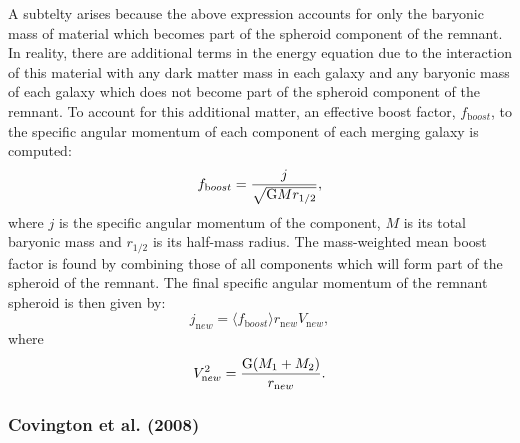 A subtelty arises because the above expression accounts for only the baryonic mass of material which becomes part of the spheroid \gls{component} of the remnant. In reality, there are additional terms in the energy equation due to the interaction of this material with any dark matter mass in each galaxy and any baryonic mass of each galaxy which does not become part of the spheroid \gls{component} of the remnant. To account for this additional matter, an effective boost factor, $f_{\mathrm boost}$, to the specific angular momentum of each \gls{component} of each merging galaxy is computed:
\begin{equation}
 f_{\mathrm boost} = {j \over \sqrt{{\mathrm G} M r_{1/2}}},
\end{equation}
where $j$ is the specific angular momentum of the component, $M$ is its total baryonic mass and $r_{\mathrm 1/2}$ is its half-mass radius. The mass-weighted mean boost factor is found by combining those of all components which will form part of the spheroid of the remnant. The final specific angular momentum of the remnant spheroid is then given by:
\begin{equation}
 j_{\mathrm new} = \langle f_{\mathrm boost} \rangle r_{\mathrm new} V_{\mathrm new},
\end{equation}
where
\begin{equation}
 V_{\mathrm new}^2 = {{\mathrm G} (M_1+M_2)\over r_{\mathrm new}}.
\end{equation}

\subsubsection{Covington et al. (2008)}

